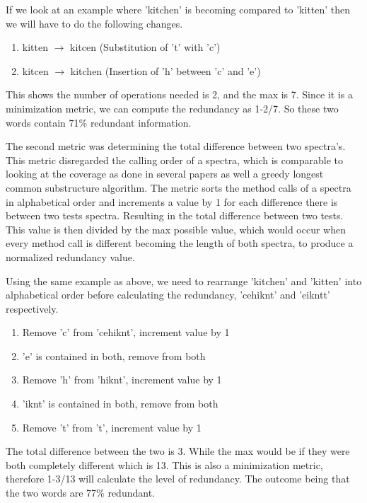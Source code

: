 If we look at an example where 'kitchen' is becoming compared to 'kitten' then we will have to do the following changes.

\begin{enumerate}
\item kitten $\rightarrow$ kitcen (Substitution of 't' with 'c')
\item kitcen $\rightarrow$ kitchen (Insertion of 'h' between 'c' and 'e')
\end{enumerate}

This shows the number of operations needed is 2, and the max is 7. Since it is a minimization metric, we can compute the redundancy as 1-2/7. So these two words contain 71\% redundant information. 

The second metric was determining the total difference between two spectra's. This metric disregarded the calling order of a spectra, which is comparable to looking at the coverage as done in several papers \cite{fraser2007redundancy} \cite{koochakzadeh2009test} \cite{zhang2011empirical} \cite{jeffrey2005test} as well a greedy longest common substructure algorithm. The metric sorts the method calls of a spectra in alphabetical order and increments a value by 1 for each difference there is between two tests spectra. Resulting in the total difference between two tests. This value is then divided by the max possible value, which would occur when every method call is different becoming the length of both spectra, to produce a normalized redundancy value.

Using the same example as above, we need to rearrange 'kitchen' and 'kitten' into alphabetical order before calculating the redundancy, 'cehiknt' and 'eikntt' respectively.

\begin{enumerate}
\item Remove 'c' from 'cehiknt', increment value by 1
\item 'e' is contained in both, remove from both
\item Remove 'h' from 'hiknt', increment value by 1
\item 'iknt' is contained in both, remove from both
\item Remove 't' from 't', increment value by 1
\end{enumerate}

The total difference between the two is 3. While the max would be if they were both completely different which is 13. This is also a minimization metric, therefore 1-3/13 will calculate the level of redundancy. The outcome being that the two words are 77\% redundant.



